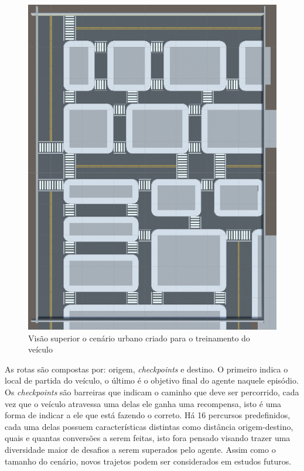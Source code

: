 \begin{figure}[h]
   \centering
   \includegraphics[scale=0.5, angle=90]{figs/Mapa-simulador-visao-superior.png}
    \caption{Visão superior o cenário urbano criado para o treinamento do veículo}
 \end{figure}

As rotas são compostas por: origem, \textit{checkpoints} e destino. O primeiro indica o local de partida do veículo, o último é o objetivo final do agente naquele episódio. Os \textit{checkpoints} são barreiras que indicam o caminho que deve ser percorrido, cada vez que o veículo atravessa uma delas ele ganha uma recompensa, isto é uma forma de indicar a ele que está fazendo o correto. Há 16 percursos predefinidos, cada uma delas possuem características distintas como distância origem-destino, quais e quantas conversões a serem feitas, isto fora pensado visando trazer uma diversidade maior de desafios a serem superados pelo agente. Assim como o tamanho do cenário, novos trajetos podem ser considerados em estudos futuros.

